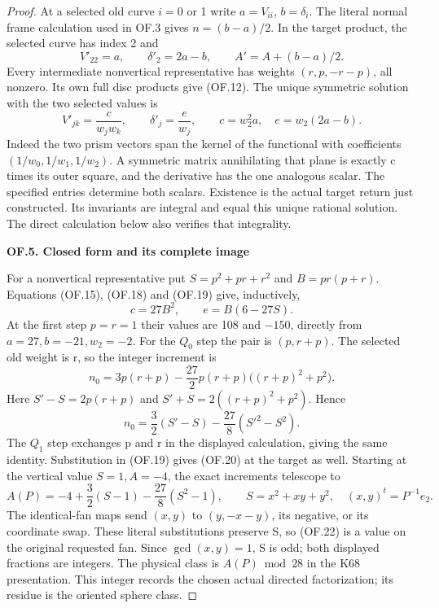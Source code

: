 \begin{proof}
At a selected old curve \(i=0\) or 1 write
\(a=V_{ii}\), \(b=\delta_i\). The literal normal
frame calculation used in OF.3 gives
\(n=(b-a)/2\). In the target product, the selected
curve has index 2 and
\[
 V'_{22}=a,\qquad\delta'_2=2a-b,
 \qquad A'=A+(b-a)/2.                              \tag{OF.18}
\]
Every intermediate nonvertical representative has
weights \((r,p,-r-p)\), all nonzero. Its own full
disc products give (OF.12). The unique symmetric
solution with the two selected values is
\[
 V'_{jk}=\frac{c}{w_jw_k},\qquad
 \delta'_j=\frac{e}{w_j},\qquad
 c=w_2^2a,\quad e=w_2(2a-b).                       \tag{OF.19}
\]
Indeed the two prism vectors span the kernel of the
functional with coefficients \((1/w_0,1/w_1,1/w_2)\).
A symmetric matrix annihilating that plane is exactly
c times its outer square, and the derivative has the
one analogous scalar. The specified entries determine
both scalars. Existence is the actual target return
just constructed. Its invariants are integral and
equal this unique rational solution. The direct
calculation below also verifies that integrality.

\par

\medskip\noindent\textbf{OF.5. Closed form and its complete image}

\par\nobreak

For a nonvertical representative put
\(S=p^2+pr+r^2\) and \(B=pr(p+r)\). Equations
(OF.15), (OF.18) and (OF.19) give, inductively,
\[
 c=27B^2,\qquad e=B(6-27S).                        \tag{OF.20}
\]
At the first step \(p=r=1\) their values are 108 and
\(-150\), directly from \(a=27,b=-21,w_2=-2\).
For the \(Q_0\) step the pair is \((p,r+p)\).
The selected old weight is r, so the integer increment
is
\[
 n_0=3p(r+p)-\frac{27}{2}p(r+p)
                         \big((r+p)^2+p^2\big).
\]
Here
\(S'-S=2p(r+p)\) and
\(S'+S=2((r+p)^2+p^2)\). Hence
\[
 n_0=\frac32(S'-S)-\frac{27}{8}(S'^2-S^2).          \tag{OF.21}
\]
The \(Q_1\) step exchanges p and r in the displayed
calculation, giving the same identity. Substitution
in (OF.19) gives (OF.20) at the target as well.
Starting at the vertical value \(S=1,A=-4\), the
exact increments telescope to
\[
 A(P)=-4+\frac32(S-1)-\frac{27}{8}(S^2-1),\qquad
 S=x^2+xy+y^2,\quad (x,y)^t=P^{-1}e_2.             \tag{OF.22}
\]
The identical-fan maps send \((x,y)\) to
\((y,-x-y)\), its negative, or its coordinate swap.
These literal substitutions preserve S, so (OF.22)
is a value on the original requested fan. Since
\(\gcd(x,y)=1\), S is odd; both displayed fractions
are integers. The physical class is \(A(P)\bmod28\)
in the K68 presentation. This integer records the
chosen actual directed factorization; its residue
is the oriented sphere class.


\end{proof}
